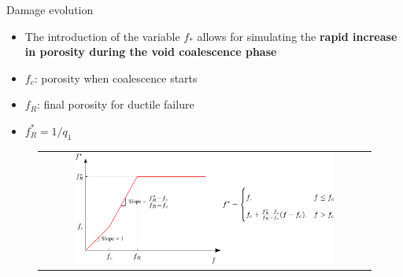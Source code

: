 \documentclass[9pt]{beamer}
\begin{document}

\begin{frame}[noframenumbering]{Damage evolution}

    \begin{itemize}
        \item The introduction of the variable $f_{\ast}$ allows for simulating the \textbf{rapid increase in porosity during the void coalescence phase}
        \vspace{0.15cm}
        \item $f_c$: porosity when coalescence starts
        \vspace{0.15cm}
        \item $f_R$: final porosity for ductile failure
        \vspace{0.15cm}
        \item $f_R^{\ast} = 1/q_1$
    \end{itemize}

    \begin{figure}
        \begin{tabular}{c}
            \includegraphics[width=0.8\textwidth]{Images/fstar.pdf}
        \end{tabular}
    \end{figure}

\end{frame}

\end{document}
